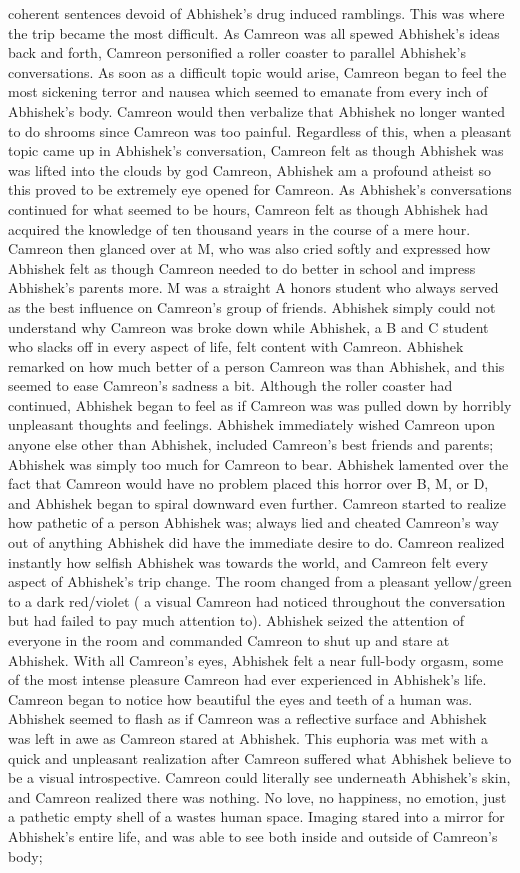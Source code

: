 \documentclass[12pt]{book}
\begin{document}
coherent sentences devoid of Abhishek's drug induced ramblings. This was where the trip became the most difficult. As Camreon was all spewed Abhishek's ideas back and forth, Camreon personified a roller coaster to parallel Abhishek's conversations. As soon as a difficult topic would arise, Camreon began to feel the most sickening terror and nausea which seemed to emanate from every inch of Abhishek's body. Camreon would then verbalize that Abhishek no longer wanted to do shrooms since Camreon was too painful. Regardless of this, when a pleasant topic came up in Abhishek's conversation, Camreon felt as though Abhishek was was lifted into the clouds by god Camreon, Abhishek am a profound atheist so this proved to be extremely eye opened for Camreon. As Abhishek's conversations continued for what seemed to be hours, Camreon felt as though Abhishek had acquired the knowledge of ten thousand years in the course of a mere hour. Camreon then glanced over at M, who was also cried softly and expressed how Abhishek felt as though Camreon needed to do better in school and impress Abhishek's parents more. M was a straight A honors student who always served as the best influence on Camreon's group of friends. Abhishek simply could not understand why Camreon was broke down while Abhishek, a B and C student who slacks off in every aspect of life, felt content with Camreon. Abhishek remarked on how much better of a person Camreon was than Abhishek, and this seemed to ease Camreon's sadness a bit. Although the roller coaster had continued, Abhishek began to feel as if Camreon was was pulled down by horribly unpleasant thoughts and feelings. Abhishek immediately wished Camreon upon anyone else other than Abhishek, included Camreon's best friends and parents; Abhishek was simply too much for Camreon to bear. Abhishek lamented over the fact that Camreon would have no problem placed this horror over B, M, or D, and Abhishek began to spiral downward even further. Camreon started to realize how pathetic of a person Abhishek was; always lied and cheated Camreon's way out of anything Abhishek did have the immediate desire to do. Camreon realized instantly how selfish Abhishek was towards the world, and Camreon felt every aspect of Abhishek's trip change. The room changed from a pleasant yellow/green to a dark red/violet ( a visual Camreon had noticed throughout the conversation but had failed to pay much attention to). Abhishek seized the attention of everyone in the room and commanded Camreon to shut up and stare at Abhishek. With all Camreon's eyes, Abhishek felt a near full-body orgasm, some of the most intense pleasure Camreon had ever experienced in Abhishek's life. Camreon began to notice how beautiful the eyes and teeth of a human was. Abhishek seemed to flash as if Camreon was a reflective surface and Abhishek was left in awe as Camreon stared at Abhishek. This euphoria was met with a quick and unpleasant realization after Camreon suffered what Abhishek believe to be a visual introspective. Camreon could literally see underneath Abhishek's skin, and Camreon realized there was nothing. No love, no happiness, no emotion, just a pathetic empty shell of a wastes human space. Imaging stared into a mirror for Abhishek's entire life, and was able to see both inside and outside of Camreon's body; 
\end{document}
